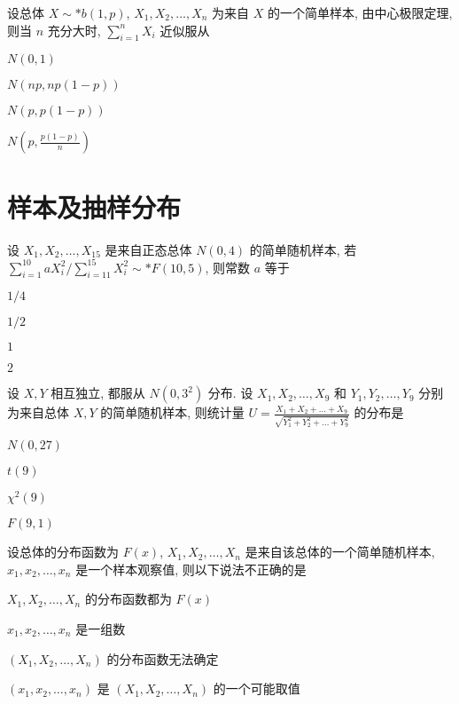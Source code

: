 \documentclass{exam-zh}
\begin{document}
\begin{question}
  设总体 $X \sim* b(1, p)$, $X_1, X_2, \dots, X_n$ 为来自 $X$ 的一个简单样本, 由中心极限定理, 则当 $n$ 充分大时, $\sum_{i=1}^n X_i$ 近似服从
  \paren[B]

  \begin{choices}
  \item $N(0, 1)$
  \item $N(np, np(1-p))$
  \item $N(p, p(1-p))$
  \item $N\left(p, \frac{p(1-p)}{n}\right)$
  \end{choices}
\end{question}

\section{样本及抽样分布}

\begin{question}
  设 $X_1, X_2, \dots, X_{15}$ 是来自正态总体 $N(0, 4)$ 的简单随机样本, 若 $\sum_{i=1}^{10} aX_i^2 / \sum_{i=11}^{15} X_i^2 \sim* F(10, 5)$, 则常数 $a$ 等于
  \paren[B]

  \begin{choices}
    \item $1/4$
    \item $1/2$
    \item $1$
    \item $2$
  \end{choices}
\end{question}

\begin{question}
  设 $X, Y$ 相互独立, 都服从 $N(0, 3^2)$ 分布. 设 $X_1, X_2, \dots, X_9$ 和 $Y_1, Y_2, \dots, Y_9$ 分别为来自总体 $X, Y$ 的简单随机样本, 则统计量 $U = \frac{X_1 + X_2 + \dots + X_9}{\sqrt{Y_1^2 + Y_2^2 + \dots + Y_9^2}}$ 的分布是
  \paren[B]

  \begin{choices}
    \item $N(0, 27)$
    \item $t(9)$
    \item $\chi^2(9)$
    \item $F(9, 1)$
  \end{choices}
\end{question}

\begin{question}
  设总体的分布函数为 $F(x)$, $X_1, X_2, \dots, X_n$ 是来自该总体的一个简单随机样本, $x_1, x_2, \dots, x_n$ 是一个样本观察值, 则以下说法不正确的是
  \paren[C]

  \begin{choices}
    \item $X_1, X_2, \dots, X_n$ 的分布函数都为 $F(x)$
    \item $x_1, x_2, \dots, x_n$ 是一组数
    \item $(X_1, X_2, \dots, X_n)$ 的分布函数无法确定
    \item $(x_1, x_2, \dots, x_n)$ 是 $(X_1, X_2, \dots, X_n)$ 的一个可能取值
  \end{choices}
\end{question}
\end{document}
